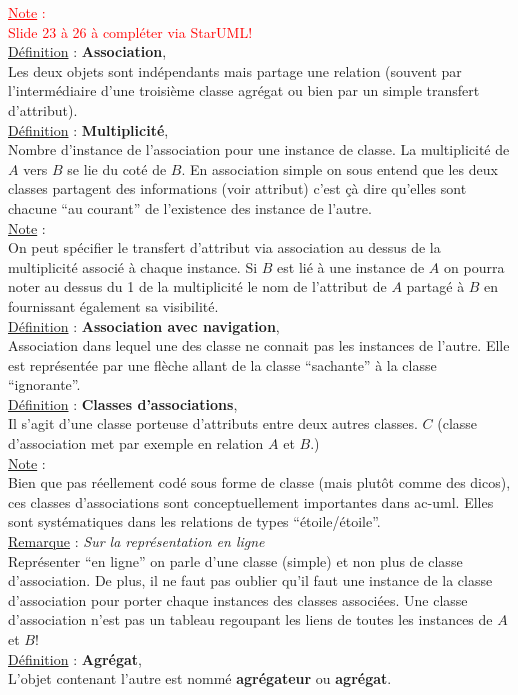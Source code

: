\documentclass[a4paper,12pt,twoside]{article}
\newcommand{\rem}[2]{\noindent\underline{Remarque} : \textit{#1}\\ \indent #2}
\newcommand{\note}[1]{\noindent\underline{Note} : \\ \indent #1}
\newcommand{\defi}[2]{\noindent\underline{Définition} : \textbf{#1},\\ \indent #2}
\begin{document}
\textcolor{red}{\note{Slide 23 à 26 à compléter via StarUML!}}\\

\defi{Association}{Les deux objets sont indépendants mais partage une relation (souvent par l'intermédiaire d'une troisième classe agrégat ou bien par un simple transfert d'attribut).} \\

\defi{Multiplicité}{Nombre d'instance de l'association pour une instance de classe. La multiplicité de $A$ vers $B$ se lie du coté de $B$. En association simple on sous entend que les deux classes partagent des informations (voir attribut) c'est çà dire qu'elles sont chacune ``au courant'' de l'existence des instance de l'autre.} \\

\note{On peut spécifier le transfert d'attribut via association au dessus de la multiplicité associé à chaque instance. Si $B$ est lié à une instance de $A$ on pourra noter au dessus du 1 de la multiplicité le nom de l'attribut de $A$ partagé à $B$ en fournissant également sa visibilité.}\\

\defi{Association avec navigation}{Association dans lequel une des classe ne connait pas les instances de l'autre. Elle est représentée par une flèche allant de la classe ``sachante'' à la classe ``ignorante''.}\\

\defi{Classes d'associations}{Il s'agit d'une classe porteuse d'attributs entre deux autres classes. $C$ (classe d'association met par exemple en relation $A$ et $B$.)}\\

\note{Bien que pas réellement codé sous forme de classe (mais plutôt comme des dicos), ces classes d'associations sont conceptuellement importantes dans \gls{ac-uml}. Elles sont systématiques dans les relations de types ``étoile/étoile''.}\\

\rem{Sur la représentation en ligne}{Représenter ``en ligne'' on parle d'une classe (simple) et non plus de classe d'association. De plus, il ne faut pas oublier qu'il faut une instance de la classe d'association pour porter chaque instances des classes associées. Une classe d'association n'est pas un tableau regoupant les liens de toutes les instances de $A$ et $B$!}\\

\defi{Agrégat}{L'objet contenant l'autre est nommé \textbf{agrégateur} ou \textbf{agrégat}.} \\
\end{document}
